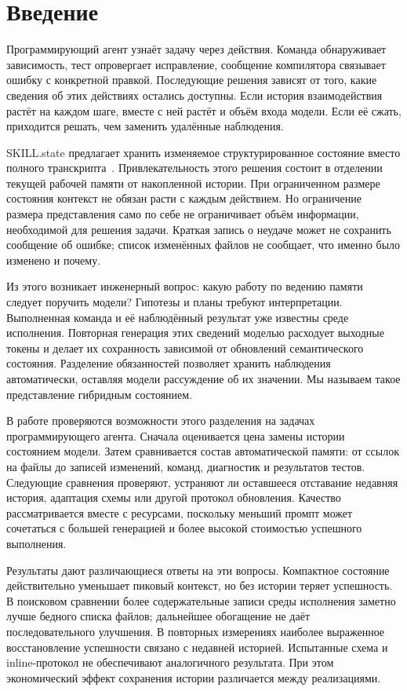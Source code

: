 \section{Введение}
\label{sec:introduction}
Программирующий агент узнаёт задачу через действия. Команда обнаруживает зависимость, тест опровергает исправление, сообщение компилятора связывает ошибку с конкретной правкой. Последующие решения зависят от того, какие сведения об этих действиях остались доступны. Если история взаимодействия растёт на каждом шаге, вместе с ней растёт и объём входа модели. Если её сжать, приходится решать, чем заменить удалённые наблюдения.

SKILL.state предлагает хранить изменяемое структурированное состояние вместо полного транскрипта~\citep{skillstate2026}. Привлекательность этого решения состоит в отделении текущей рабочей памяти от накопленной истории. При ограниченном размере состояния контекст не обязан расти с каждым действием. Но ограничение размера представления само по себе не ограничивает объём информации, необходимой для решения задачи. Краткая запись о неудаче может не сохранить сообщение об ошибке; список изменённых файлов не сообщает, что именно было изменено и почему.

Из этого возникает инженерный вопрос: какую работу по ведению памяти следует поручить модели? Гипотезы и планы требуют интерпретации. Выполненная команда и её наблюдённый результат уже известны среде исполнения. Повторная генерация этих сведений моделью расходует выходные токены и делает их сохранность зависимой от обновлений семантического состояния. Разделение обязанностей позволяет хранить наблюдения автоматически, оставляя модели рассуждение об их значении. Мы называем такое представление гибридным состоянием.

В работе проверяются возможности этого разделения на задачах программирующего агента. Сначала оценивается цена замены истории состоянием модели. Затем сравнивается состав автоматической памяти: от ссылок на файлы до записей изменений, команд, диагностик и результатов тестов. Следующие сравнения проверяют, устраняют ли оставшееся отставание недавняя история, адаптация схемы или другой протокол обновления. Качество рассматривается вместе с ресурсами, поскольку меньший промпт может сочетаться с большей генерацией и более высокой стоимостью успешного выполнения.

Результаты дают различающиеся ответы на эти вопросы. Компактное состояние действительно уменьшает пиковый контекст, но без истории теряет успешность. В поисковом сравнении более содержательные записи среды исполнения заметно лучше бедного списка файлов; дальнейшее обогащение не даёт последовательного улучшения. В повторных измерениях наиболее выраженное восстановление успешности связано с недавней историей. Испытанные схема и inline-протокол не обеспечивают аналогичного результата. При этом экономический эффект сохранения истории различается между реализациями.

